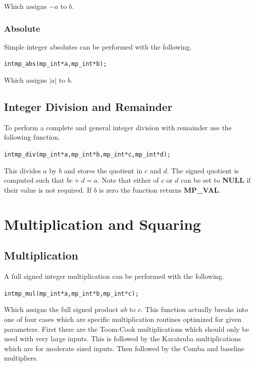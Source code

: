 \documentclass[synpaper]{book}
\begin{document}
Which assigns $-a$ to $b$.  

\subsection{Absolute}
Simple integer absolutes can be performed with the following.

\begin{alltt}
int mp_abs (mp_int * a, mp_int * b);
\end{alltt}

Which assigns $\vert a \vert$ to $b$.  

\section{Integer Division and Remainder}
To perform a complete and general integer division with remainder use the following function.

\begin{alltt}
int mp_div (mp_int * a, mp_int * b, mp_int * c, mp_int * d);
\end{alltt}
                                                        
This divides $a$ by $b$ and stores the quotient in $c$ and $d$.  The signed quotient is computed such that 
$bc + d = a$.  Note that either of $c$ or $d$ can be set to \textbf{NULL} if their value is not required.  If 
$b$ is zero the function returns \textbf{MP\_VAL}.  


\chapter{Multiplication and Squaring}
\section{Multiplication}
A full signed integer multiplication can be performed with the following.
\begin{alltt}
int mp_mul (mp_int * a, mp_int * b, mp_int * c);
\end{alltt}
Which assigns the full signed product $ab$ to $c$.  This function actually breaks into one of four cases which are 
specific multiplication routines optimized for given parameters.  First there are the Toom-Cook multiplications which
should only be used with very large inputs.  This is followed by the Karatsuba multiplications which are for moderate
sized inputs.  Then followed by the Comba and baseline multipliers.
\end{document}
